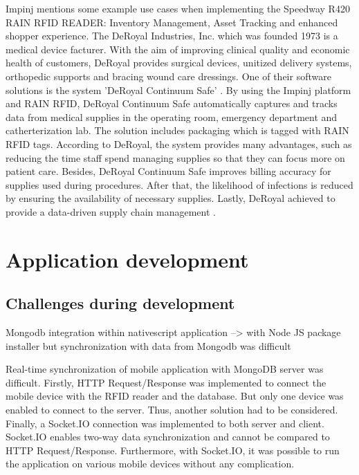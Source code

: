Impinj mentions some example use cases when implementing the Speedway R420 RAIN RFID READER: Inventory Management, Asset Tracking and enhanced shopper experience. 
The DeRoyal Industries, Inc. which was founded 1973 is a medical device facturer\cite{deroyal}. With the aim of improving clinical quality and economic health of customers, DeRoyal provides surgical devices, unitized delivery systems, orthopedic supports and bracing wound care dressings. One of their software solutions is the system 'DeRoyal Continuum Safe' \cite{deroyal}. By using the Impinj platform and RAIN RFID, DeRoyal Continuum Safe automatically captures and tracks data from medical supplies in the operating room, emergency department and catherterization lab. The solution includes packaging which is tagged with RAIN RFID tags. According to DeRoyal, the system provides many advantages, such as reducing the time staff spend managing supplies so that they can focus more on patient care. Besides, DeRoyal Continuum Safe improves billing accuracy for supplies used during procedures. After that, the likelihood of infections is reduced by ensuring the availability of necessary supplies. Lastly, DeRoyal achieved to provide a data-driven supply chain management \cite{deroyal}. 

%
%
\section{Application development} \label{app_development}

\subsection{Challenges during development}

Mongodb integration within nativescript application 
--> with Node JS package installer 
but synchronization with data from Mongodb was difficult

Real-time synchronization of mobile application with MongoDB server was difficult. Firstly, HTTP Request/Response was implemented to connect the mobile device with the RFID reader and the database. But only one device was enabled to connect to the server. Thus, another solution had to be considered. Finally, a Socket.IO connection was implemented to both server and client. Socket.IO enables two-way data synchronization and cannot be compared to HTTP Request/Response. Furthermore, with Socket.IO, it was possible to run the application on various mobile devices without any complication. 

